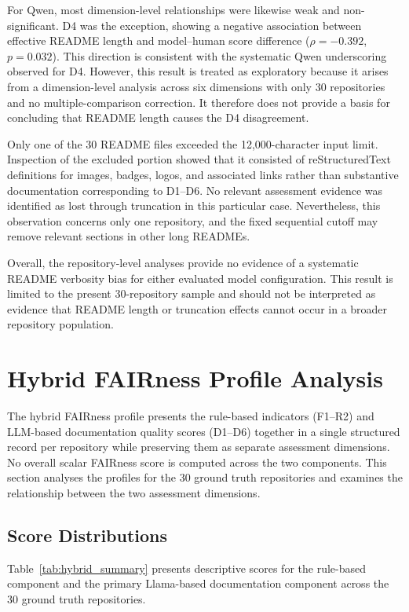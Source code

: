 For Qwen, most dimension-level relationships were likewise weak and
non-significant. D4 was the exception, showing a negative association
between effective README length and model--human score difference
($\rho=-0.392$, $p=0.032$). This direction is consistent with the
systematic Qwen underscoring observed for D4. However, this result is
treated as exploratory because it arises from a dimension-level
analysis across six dimensions with only 30 repositories and no
multiple-comparison correction. It therefore does not provide a
basis for concluding that README length causes the D4 disagreement.

Only one of the 30 README files exceeded the 12,000-character input
limit. Inspection of the excluded portion showed that it consisted
of reStructuredText definitions for images, badges, logos, and
associated links rather than substantive documentation corresponding
to D1--D6. No relevant assessment evidence was identified as lost
through truncation in this particular case. Nevertheless, this
observation concerns only one repository, and the fixed sequential
cutoff may remove relevant sections in other long READMEs.

Overall, the repository-level analyses provide no evidence of a
systematic README verbosity bias for either evaluated model
configuration. This result is limited to the present 30-repository
sample and should not be interpreted as evidence that README length
or truncation effects cannot occur in a broader repository
population.

\section{Hybrid FAIRness Profile Analysis}

The hybrid FAIRness profile presents the rule-based indicators
(F1--R2) and LLM-based documentation quality scores (D1--D6)
together in a single structured record per repository while
preserving them as separate assessment dimensions. No overall
scalar FAIRness score is computed across the two components.
This section analyses the profiles for the 30 ground truth
repositories and examines the relationship between the two
assessment dimensions.
\subsection{Score Distributions}

Table~\ref{tab:hybrid_summary} presents descriptive scores for the
rule-based component and the primary Llama-based documentation
component across the 30 ground truth repositories.

